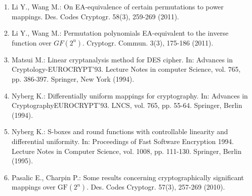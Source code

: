 \documentclass[10pt]{article}
\begin{document}
\begin{enumerate}
  \item Li Y., Wang M.: On EA-equivalence of certain permutations to power mappings. Des. Codes Cryptogr. 58(3), 259-269 (2011).
  \item Li Y., Wang M.: Permutation polynomials EA-equivalent to the inverse function over $G F\left(2^{n}\right)$. Cryptogr. Commun. 3(3), 175-186 (2011).
  \item Matsui M.: Linear cryptanalysis method for DES cipher. In: Advances in Cryptology-EUROCRYPT'93. Lecture Notes in computer Science, vol. 765, pp. 386-397. Springer, New York (1994).
  \item Nyberg K.: Differentially uniform mappings for cryptography. In: Advances in CryptographyEUROCRYPT'93. LNCS, vol. 765, pp. 55-64. Springer, Berlin (1994).
  \item Nyberg K.: S-boxes and round functions with controllable linearity and differential uniformity. In: Proceedings of Fast Software Encryption 1994. Lecture Notes in Computer Science, vol. 1008, pp. 111-130. Springer, Berlin (1995).
  \item Pasalic E., Charpin P.: Some results concerning cryptographically significant mappings over $\mathrm{GF}\left(2^{n}\right)$. Des. Codes Cryptogr. 57(3), 257-269 (2010).
\end{enumerate}
\end{document}
